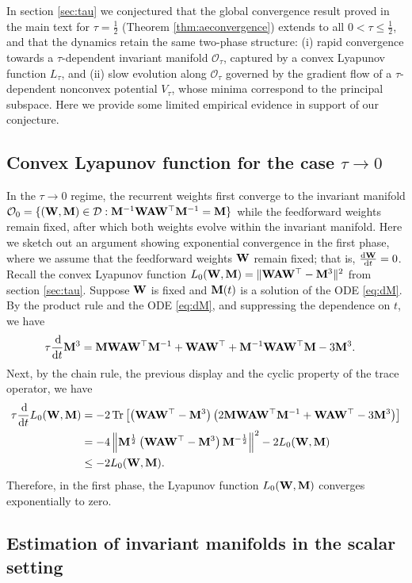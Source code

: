 \documentclass[11pt]{article}
\theoremstyle{definition}
\DeclareMathOperator{\tr}{Tr}
\newcommand{\dd}{\operatorname{d}\!}
\newcommand{\A}{{\bf A}}
\newcommand{\M}{{\bf M}}
\newcommand{\W}{{\bf W}}
\newcommand{\calD}{\mathcal{D}}
\newcommand{\calO}{\mathcal{O}}
\begin{document}
In section \ref{sec:tau} we conjectured that the global convergence result proved in the main text for $\tau=\frac12$ (Theorem \ref{thm:aeconvergence}) extends to all $0<\tau\le\frac12$, and that the dynamics retain the same two-phase structure: (i) rapid convergence towards a $\tau$-dependent invariant manifold $\calO_\tau$, captured by a convex Lyapunov function $L_\tau$, and (ii) slow evolution along $\calO_\tau$ governed by the gradient flow of a $\tau$-dependent nonconvex potential $V_\tau$, whose minima correspond to the principal subspace.
Here we provide some limited empirical evidence in support of our conjecture.

\subsection{Convex Lyapunov function for the case $\tau\to0$}
\label{apdx:lyapunov}

In the $\tau\to0$ regime, the recurrent weights first converge to the invariant manifold $\calO_0=\{(\W,\M)\in\calD:\M^{-1}\W\A\W^\top\M^{-1}=\M\}$ while the feedforward weights remain fixed, after which both weights evolve within the invariant manifold.
Here we sketch out an argument showing exponential convergence in the first phase, where we assume that the feedforward weights $\W$ remain fixed; that is, $\frac{\dd\W}{\dd t}=0$.
Recall the convex Lyapunov function $L_0(\W,\M)=\|\W\A\W^\top-\M^3\|^2$ from section \ref{sec:tau}.
Suppose $\W$ is fixed and $\M(t)$ is a solution of the ODE \eqref{eq:dM}.
By the product rule and the ODE \eqref{eq:dM}, and suppressing the dependence on $t$, we have
\begin{align*}
    \tau\frac{\dd}{\dd t}\M^3&=\M\W\A\W^\top\M^{-1}+\W\A\W^\top+\M^{-1}\W\A\W^\top\M-3\M^3.
\end{align*}
Next, by the chain rule, the previous display and the cyclic property of the trace operator, we have
\begin{align*}
    \tau\frac{\dd }{\dd t}L_0(\W,\M)
    &=-2\tr\left[\left(\W\A\W^\top-\M^3\right)\left(2\M\W\A\W^\top\M^{-1}+\W\A\W^\top-3\M^3\right)\right]\\
    &=-4\left\|\M^{\frac12}\left(\W\A\W^\top-\M^3\right)\M^{-\frac12}\right\|^2-2L_0(\W,\M)\\
    &\le-2L_0(\W,\M).
\end{align*}
Therefore, in the first phase, the Lyapunov function $L_0(\W,\M)$ converges exponentially to zero.

\subsection{Estimation of invariant manifolds in the scalar setting}
\label{apdx:invariant}
\end{document}
